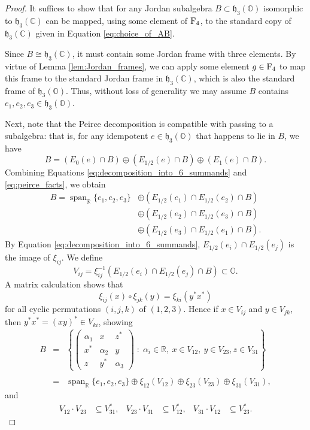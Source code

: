 \documentclass{article}
\theoremstyle{plain}
\theoremstyle{remark}
\theoremstyle{definition}
\newcommand{\spann}{\operatorname{span}} %
\newcommand{\R}{{\mathbb R}}  %
\newcommand{\C}{{\mathbb C}}  %
\renewcommand{\O}{{\mathbb O}}  %
\newcommand{\F}{{\rm F}}       %
\newcommand{\h}{\mathfrak{h}}  %
\begin{document}
\begin{proof}
It suffices to show that for any Jordan subalgebra $B\subset\h_3(\O)$ isomorphic to $\h_3(\C)$ can be mapped, using some element of $\F_4$, to the standard copy of $\h_3(\C)$ given in Equation \eqref{eq:choice_of_AB}.

Since $B \cong \h_3(\C)$, it must contain some Jordan frame with three elements.  By virtue of Lemma \ref{lem:Jordan_frames}, we can apply some element $g \in \F_4$ to map this frame to the standard Jordan frame in $\h_3(\C)$, which is also the standard frame of $\h_3(\O)$.  Thus, without loss of generality we may assume $B$ contains $e_1, e_2, e_3 \in \h_3(\O)$.   

Next, note that the Peirce decomposition is compatible with passing to a subalgebra: that is, for any idempotent $e\in \h_3(\O)$ that happens to lie in $B$, we have
\[ B=(E_0(e)\cap B)\oplus(E_{1/2}(e)\cap B)\oplus(E_1(e)\cap B).\]
Combining Equations \eqref{eq:decomposition_into_6_summands} and \eqref{eq:peirce_facts}, we obtain
\begin{align*}
B=\spann_\R\{e_1,e_2,e_3\}&\oplus(E_{1/2}(e_1)\cap E_{1/2}(e_2)\cap B)\\
&\oplus(E_{1/2}(e_2)\cap E_{1/2}(e_3)\cap B)\\
&\oplus(E_{1/2}(e_3)\cap E_{1/2}(e_1)\cap B).
\end{align*}
By Equation \eqref{eq:decomposition_into_6_summands}, $E_{1/2}(e_i)\cap E_{1/2}(e_j)$ is the image of $\xi_{ij}$.   We define 
\[  V_{ij} =\xi_{ij}^{-1}(E_{1/2}(e_i)\cap E_{1/2}(e_j)\cap B) \subset \O .\]
A matrix calculation shows that
\begin{equation}
\xi_{ij}(x)\circ\xi_{jk}(y)=\xi_{ki}(y^\ast x^\ast)
\label{eq:xi_mult}
\end{equation}
for all cyclic permutations $(i,j,k)$ of $(1,2,3)$. Hence if $x\in V_{ij}$ and $y\in V_{jk}$, then $y^\ast x^\ast=(xy)^\ast\in V_{ki}$, showing 
\begin{equation}
\label{eq:decomposition}
\begin{array}{ccl}
B &=&\left\{\begin{pmatrix}
    \alpha_1&x&z^\ast\\
    x^\ast&\alpha_2&y\\
    z&y^\ast&\alpha_3\end{pmatrix} \; \colon \; \alpha_i\in\R,\ x\in V_{12},\ y\in V_{23}, z\in V_{31}\right\}\\ \\
&=& \spann_\R\{e_1,e_2,e_3\}\oplus\xi_{12}(V_{12})\oplus\xi_{23}(V_{23})\oplus\xi_{31}(V_{31}),
\end{array}
\end{equation}
and 
\begin{align}
V_{12}\cdot V_{23}&\subseteq V_{31}^\ast,&
V_{23}\cdot V_{31}&\subseteq V_{12}^\ast,&
V_{31}\cdot V_{12}&\subseteq V_{23}^\ast.
\label{eq:mult_rel1}
\end{align}


\end{proof}
\end{document}
